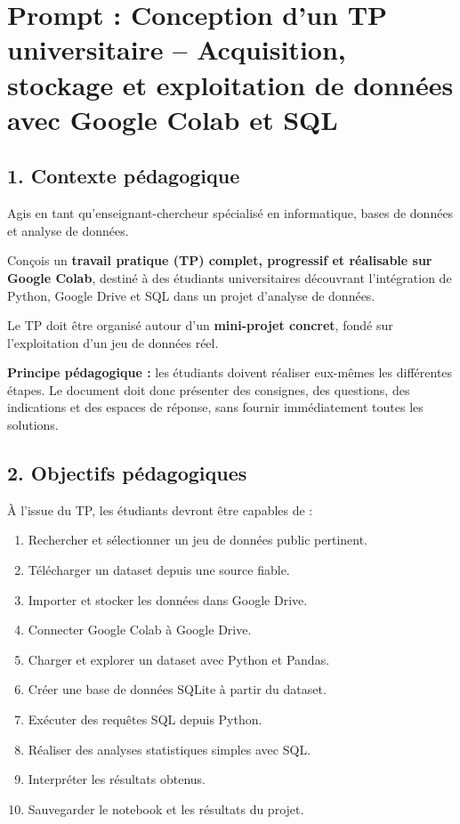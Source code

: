 \documentclass[
]{article}
\author{}
\date{}
\providecommand{\tightlist}{%
  \setlength{\itemsep}{0pt}\setlength{\parskip}{0pt}}
\begin{document}
\section{Prompt : Conception d'un TP universitaire -- Acquisition,
stockage et exploitation de données avec Google Colab et
SQL}\label{prompt-conception-dun-tp-universitaire-acquisition-stockage-et-exploitation-de-donnuxe9es-avec-google-colab-et-sql}

\subsection{1. Contexte pédagogique}\label{contexte-puxe9dagogique}

Agis en tant qu'enseignant-chercheur spécialisé en informatique, bases
de données et analyse de données.

Conçois un \textbf{travail pratique (TP) complet, progressif et
réalisable sur Google Colab}, destiné à des étudiants universitaires
découvrant l'intégration de Python, Google Drive et SQL dans un projet
d'analyse de données.

Le TP doit être organisé autour d'un \textbf{mini-projet concret}, fondé
sur l'exploitation d'un jeu de données réel.

\textbf{Principe pédagogique :} les étudiants doivent réaliser eux-mêmes
les différentes étapes. Le document doit donc présenter des consignes,
des questions, des indications et des espaces de réponse, sans fournir
immédiatement toutes les solutions.

\subsection{2. Objectifs pédagogiques}\label{objectifs-puxe9dagogiques}

À l'issue du TP, les étudiants devront être capables de :

\begin{enumerate}
\def\labelenumi{\arabic{enumi}.}
\tightlist
\item
  Rechercher et sélectionner un jeu de données public pertinent.
\item
  Télécharger un dataset depuis une source fiable.
\item
  Importer et stocker les données dans Google Drive.
\item
  Connecter Google Colab à Google Drive.
\item
  Charger et explorer un dataset avec Python et Pandas.
\item
  Créer une base de données SQLite à partir du dataset.
\item
  Exécuter des requêtes SQL depuis Python.
\item
  Réaliser des analyses statistiques simples avec SQL.
\item
  Interpréter les résultats obtenus.
\item
  Sauvegarder le notebook et les résultats du projet.
\end{enumerate}
\end{document}
